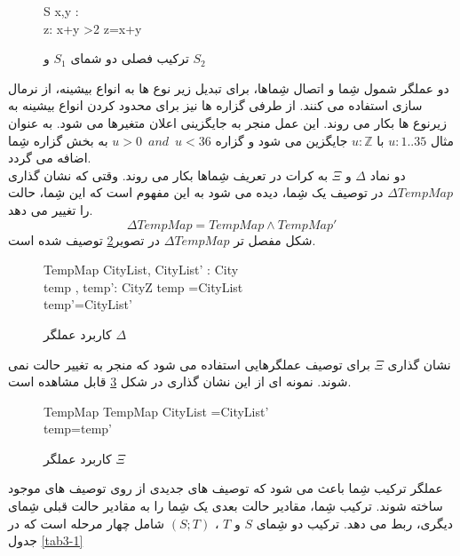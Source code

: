  
\begin{figure}
\centering
\begin{schema}{S}
x,y : \enspace {}
\\
z:
\where
x+y >2 \wedge z=x+y
\end{schema}
\caption{ترکیب فصلی دو شمای $S_1$ و $S_2$}
\label{fig 3-3}
\end{figure}

دو عملگر شمول شِما و اتصال شِماها، برای تبدیل زیر نوع ها به انواع بیشینه، از نرمال سازی استفاده می کنند. از طرفی گزاره ها نیز برای محدود کردن انواع بیشینه به زیرنوع ها بکار می روند. این عمل منجر به جایگزینی اعلان متغیرها می شود. به عنوان مثال 
$u: 1 . . 35$ با $u:\mathbb{Z}$ جایگزین می شود و گزاره 
$u>0 \enspace and \enspace u<36$
به بخش گزاره شِما اضافه می گردد.
\\
دو نماد $\Delta$ و $\Xi$ به کرات در تعریف شِماها بکار می روند. وقتی که نشان گذاری 
$\Delta TempMap$
 در توصیف یک شِما، دیده می شود به این مفهوم است که این شِما، حالت را تغییر می دهد.
 \[ 
 \Delta TempMap= TempMap \land TempMap'
 \]
 شکل مفصل تر $\Delta TempMap$  در تصویر\ref{fig 3-4} توصیف شده است.
 
 \begin{figure}
\centering
\begin{schema}{\Delta TempMap}
CityList, CityList' : \enspace {}\enspace City
\\
temp , temp': \enspace City\nrightarrow Z
\where
\dom temp =CityList
\\
\dom temp'=CityList'
\end{schema}
\caption{کاربرد عملگر $\Delta$}
\label{fig 3-4}
\end{figure}

نشان گذاری $\Xi$ برای توصیف عملگرهایی استفاده می شود که منجر به تغییر حالت نمی شوند. نمونه ای از این نشان گذاری در شکل \ref{fig 3-5} قابل مشاهده است.

\begin{figure}
\centering
\begin{schema}{\Xi TempMap}
\Delta TempMap
\where
CityList =CityList'
\\
temp=temp'
\end{schema}
\caption{کاربرد عملگر $\Xi$}
\label{fig 3-5}
\end{figure}

عملگر ترکیب شِما باعث می شود که توصیف های جدیدی از روی توصیف های موجود ساخته شوند. ترکیب شِما، مقادیر حالت بعدی یک شِما را به مقادیر حالت قبلی شِمای دیگری، ربط می دهد. ترکیب دو شِمای $S$ و $T$ 
،
$(S;T)$
شامل چهار مرحله است که در جدول
\ref{tab3-1}


